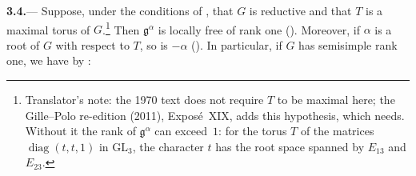 \par\medskip\noindent
\textbf{3.4.}---
Suppose, under the conditions of , that \(G\) is reductive and that
\(T\) is a maximal torus of \(G\).\footnote{Translator's note: the 1970 text does not require \(T\) to be
maximal here; the Gille--Polo re-edition (2011), Exposé~XIX, adds this
hypothesis, which  needs. Without it the rank of \(\mathfrak g^\alpha\) can
exceed~\(1\): for the torus \(T\) of the matrices \(\operatorname{diag}(t,t,1)\)
in \(\mathrm{GL}_3\), the character \(t\) has the root space spanned by
\(E_{13}\) and \(E_{23}\).}  Then \(\mathfrak g^\alpha\) is locally free of
rank one ().  Moreover, if \(\alpha\) is a root of \(G\) with
respect to \(T\), so is \(-\alpha\) ().  In particular, if \(G\) has
semisimple rank one, we have by :
